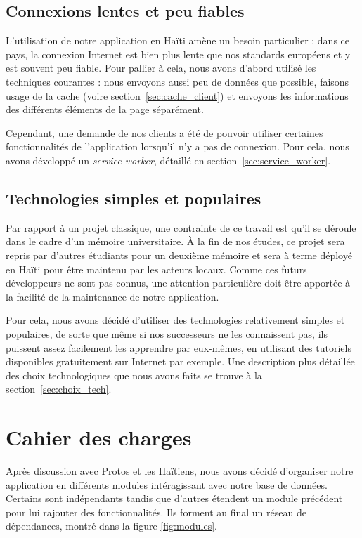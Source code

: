 \documentclass{EPL-master-thesis-covers-FR}
\begin{document}
			\subsection*{Connexions lentes et peu fiables}
				L'utilisation de notre application en Haïti amène un besoin particulier : dans ce pays, la connexion Internet est bien plus lente que nos standards européens et y est souvent peu fiable. Pour pallier à cela, nous avons d'abord utilisé les techniques courantes : nous envoyons aussi peu de données que possible, faisons usage de la cache (voire section~\ref{sec:cache_client}) et envoyons les informations des différents éléments de la page séparément.

				Cependant, une demande de nos clients a été de pouvoir utiliser certaines fonctionnalités de l'application lorsqu'il n'y a pas de connexion. Pour cela, nous avons développé un \emph{service worker}, détaillé en section~\ref{sec:service_worker}.

			\subsection*{Technologies simples et populaires}
				Par rapport à un projet classique, une contrainte de ce travail est qu'il se déroule dans le cadre d'un mémoire universitaire. À la fin de nos études, ce projet sera repris par d'autres étudiants pour un deuxième mémoire et sera à terme déployé en Haïti pour être maintenu par les acteurs locaux. Comme ces futurs développeurs ne sont pas connus, une attention particulière doit être apportée à la facilité de la maintenance de notre application.

				Pour cela, nous avons décidé d'utiliser des technologies relativement simples et populaires, de sorte que même si nos successeurs ne les connaissent pas, ils puissent assez facilement les apprendre par eux-mêmes, en utilisant des tutoriels disponibles gratuitement sur Internet par exemple. Une description plus détaillée des choix technologiques que nous avons faits se trouve à la section~\ref{sec:choix_tech}.

		\section{Cahier des charges}
			\label{sec:cahier_des_charges}

			Après discussion avec Protos et les Haïtiens, nous avons décidé d'organiser notre application en différents modules intéragissant avec notre base de données. Certains sont indépendants tandis que d'autres étendent un module précédent pour lui rajouter des fonctionnalités. Ils forment au final un réseau de dépendances, montré dans la figure \ref{fig:modules}.
\end{document}
